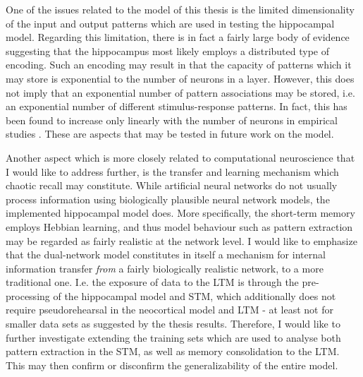 One of the issues related to the model of this thesis is the limited dimensionality of the input and output patterns which are used in testing the hippocampal model. Regarding this limitation, there is in fact a fairly large body of evidence suggesting that the hippocampus most likely employs a distributed type of encoding. Such an encoding may result in that the capacity of patterns which it may store is exponential to the number of neurons in a layer.
However, this does not imply that an exponential number of pattern associations may be stored, i.e. an exponential number of different stimulus-response patterns. In fact, this has been found to increase only linearly with the number of neurons in empirical studies \citep{Rolls1998chpt6}. These are aspects that may be tested in future work on the model.

Another aspect which is more closely related to computational neuroscience that I would like to address further, is the transfer and learning mechanism which chaotic recall may constitute.
While artificial neural networks do not usually process information using biologically plausible neural network models, the implemented hippocampal model does. More specifically, the short-term memory employs Hebbian learning, and thus model behaviour such as pattern extraction may be regarded as fairly realistic at the network level.
I would like to emphasize that the dual-network model constitutes in itself a mechanism for internal information transfer \textit{from} a fairly biologically realistic network, to a more traditional one. I.e. the exposure of data to the LTM is through the pre-processing of the hippocampal model and STM, which additionally does not require pseudorehearsal in the neocortical model and LTM - at least not for smaller data sets as suggested by the thesis results. Therefore, I would like to further investigate extending the training sets which are used to analyse both pattern extraction in the STM, as well as memory consolidation to the LTM. This may then confirm or disconfirm the generalizability of the entire model.

